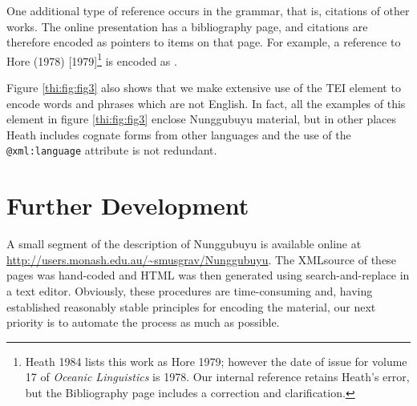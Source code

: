 One additional type of reference occurs in the grammar, that is, citations of other works. The online presentation has a bibliography page, and citations are therefore encoded as pointers to items on that page. For example, a reference to Hore (1978) [1979]\footnote{Heath 
 1984 lists this work as Hore 1979; however the date of issue for volume 17 of \textit{Oceanic Linguistics} is 1978. Our internal reference retains Heath's error, but the Bibliography page includes a correction and clarification.
} \nocite{Hore1978}
is encoded as  .

Figure \ref{thi:fig:fig3} also shows that we make extensive use of the TEI   element to encode words and phrases which are not English. In fact, all the examples of this element in figure \ref{thi:fig:fig3} enclose Nunggubuyu material, but in other places Heath includes cognate forms from other languages and the use of the \texttt{@xml:language} attribute is not redundant. 
 
\section{Further Development}
A small segment of the description of Nunggubuyu is available online at \url{http://users.monash.edu.au/~smusgrav/Nunggubuyu}. The XMLsource of these pages was hand-coded and HTML was then generated using search-and-replace in a text editor. Obviously, these procedures are time-consuming and, having established reasonably stable principles for encoding the material, our next priority is to automate the process as much as possible.


